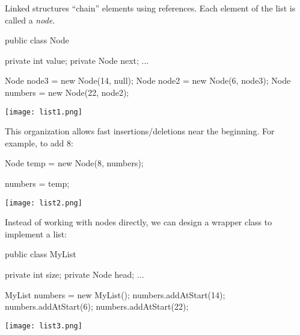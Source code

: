 
Linked structures ``chain'' elements using references.
Each element of the list is called a \emph{node}.

\vspace{1ex}
\begin{minipage}{0.40\linewidth}
\begin{javalst}
    public class Node {

        private int value;
        private Node next;
        ...
    }
\end{javalst}
\end{minipage}
\hfill
\begin{minipage}{0.58\linewidth}
\begin{javalst}
    Node node3 = new Node(14, null);
    Node node2 = new Node(6, node3);
    Node numbers = new Node(22, node2);
\end{javalst}
\texttt{[image: list1.png]}
\end{minipage}
\vspace{1em}

This organization allows fast insertions/deletions near the beginning. For example, to add 8:

\vspace{1ex}
\begin{minipage}{0.48\linewidth}
\begin{javalst}
    Node temp = new Node(8, numbers);



    numbers = temp;
\end{javalst}
\end{minipage}
\hfill
\begin{minipage}{0.50\linewidth}
\texttt{[image: list2.png]}
\end{minipage}
\vspace{1em}

Instead of working with nodes directly, we can design a wrapper class to implement a list:

\vspace{1ex}
\begin{minipage}{0.40\linewidth}
\begin{javalst}
    public class MyList {

        private int size;
        private Node head;
        ...
    }
\end{javalst}
\end{minipage}
\hfill
\begin{minipage}{0.58\linewidth}
\begin{javalst}
    MyList numbers = new MyList();
    numbers.addAtStart(14);
    numbers.addAtStart(6);
    numbers.addAtStart(22);
\end{javalst}
\texttt{[image: list3.png]}
\end{minipage}
\vspace{1ex}


